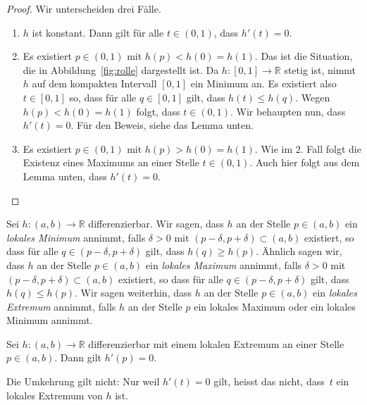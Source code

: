 \documentclass[../main.tex]{subfiles}
\begin{document}
\begin{proof}
  Wir unterscheiden drei Fälle.
  \begin{enumerate}[1.]
    \item $h$ ist konstant.
      Dann gilt für alle $t\in (0, 1)$,
      dass $h'(t) = 0$.
    \item Es existiert $p \in (0, 1)$ 
      mit $h(p) < h(0) = h(1)$.
      Das ist die Situation, die in
      Abbildung~\ref{fig:rolle} dargestellt ist.
      Da $h \colon [0, 1] \to \mathbb{R}$ 
      stetig ist, nimmt $h$ auf dem
      kompakten Intervall
      $[0, 1]$ ein Minimum an.
      Es existiert also $t \in [0, 1]$
      so, dass für alle $q \in [0, 1]$ 
      gilt, dass
      $h(t) \leq h(q)$.
      Wegen $h(p) < h(0) = h(1)$ folgt,
      dass $t \in (0, 1)$.
      Wir behaupten nun, dass $h'(t) = 0$.
      Für den Beweis, siehe das Lemma unten.
    \item Es existiert $p \in (0, 1)$ mit
      $h(p) > h(0) = h(1)$. Wie im 2. Fall
      folgt die Existenz eines Maximums
      an einer Stelle $t \in (0, 1)$.
      Auch hier folgt aus dem Lemma unten,
      dass $h'(t) = 0$. \qedhere
  \end{enumerate}
\end{proof}

\begin{definition}
  Sei $h \colon (a, b) \to \mathbb{R}$ differenzierbar.
  Wir sagen, dass $h$ an der Stelle
  $p \in (a, b)$ ein \emph{lokales
  Minimum} annimmt, falls $\delta > 0$
  mit $ (p - \delta, p + \delta)
  \subset (a, b)$ existiert,
  so dass für alle $q \in (p - \delta, p + \delta)$
  gilt, dass  $h(q) \geq h(p)$. Ähnlich sagen wir,
  dass $h$ an der Stelle
  $p \in (a, b)$ ein \emph{lokales Maximum}
  annimmt, falls $\delta > 0$ mit
  $(p - \delta, p + \delta) \subset (a, b)$
  existiert, so dass für alle $q \in (p - \delta, p + \delta)$ 
  gilt, dass $h(q) \leq h(p)$.
  Wir sagen weiterhin, dass $h$ an der
  Stelle $p \in (a, b)$ ein
  \emph{lokales Extremum} annimmt, falls 
  $h$ an der Stelle $p$
  ein lokales Maximum oder ein lokales Minimum
  annimmt.
\end{definition}


\begin{lemma*}
  Sei $h \colon (a, b) \to \mathbb{R}$
  differenzierbar mit einem lokalen
  Extremum an einer Stelle
  $p \in (a, b)$. Dann gilt $h'(p) = 0$.
\end{lemma*}

\begin{remark}
  Die Umkehrung gilt nicht: Nur weil $h'(t) = 0$ 
  gilt, heisst das nicht, dass~$t$ ein
  lokales Extremum von $h$ ist.
\end{remark}
\end{document}
